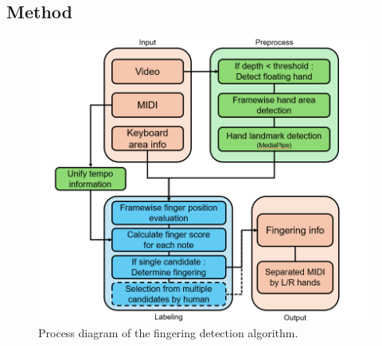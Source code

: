 \documentclass{article}
\begin{document}



\subsection{Method}
% 
\begin{figure}
    \centering
    \includegraphics[width=\linewidth]{Images/fingering_detection.png}\hspace*{0cm}
    \caption{Process diagram of the fingering detection algorithm.}
    \label{fig:fingering_diagram}
\end{figure}
\end{document}
